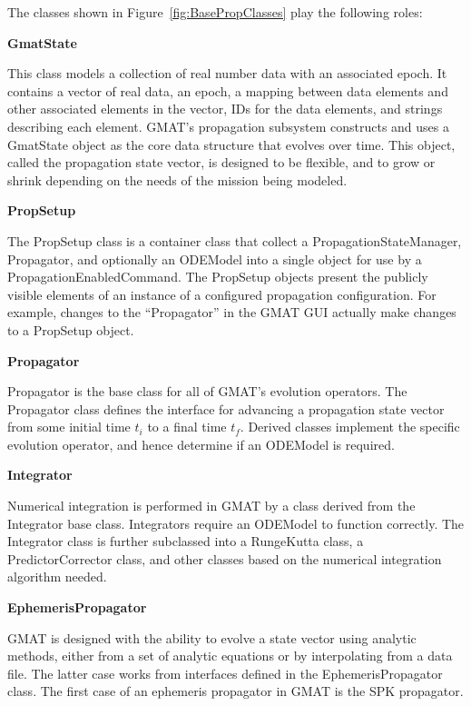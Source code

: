 \documentclass[letterpaper,10pt]{article}
\begin{document}
The classes shown in Figure~\ref{fig:BasePropClasses} play the following roles:

\begin{description}
\item \textbf{GmatState}

This class models a collection of real number data with an associated epoch. 
It contains a vector of real data, an epoch, a mapping between data elements
and other associated elements in the vector, IDs for the data elements, and
strings describing each element. GMAT's propagation subsystem constructs and
uses a GmatState object as the core data structure that evolves over time. 
This object, called the propagation state vector, is designed to be flexible,
and to grow or shrink depending on the needs of the mission being modeled. 

\item \textbf{PropSetup}

The PropSetup class is a container class that collect a
PropagationStateManager, Propagator, and optionally an ODEModel into a single
object for use by a PropagationEnabledCommand.  The PropSetup objects present
the publicly visible elements of an instance of a configured propagation
configuration. For example, changes to the ``Propagator'' in the GMAT GUI
actually make changes to a PropSetup object.

\item \textbf{Propagator}

Propagator is the base class for all of GMAT's evolution operators.  The
Propagator class defines the interface for advancing a propagation state vector
from some initial time $t_i$ to a final time $t_f$.  Derived classes implement
the specific evolution operator, and hence determine if an ODEModel is required.

\item \textbf{Integrator}

Numerical integration is performed in GMAT by a class derived from the
Integrator base class.  Integrators require an ODEModel to function correctly. 
The Integrator class is further subclassed into a RungeKutta class, a
PredictorCorrector class, and other classes based on the numerical integration
algorithm needed.

\item\textbf{EphemerisPropagator}

GMAT is designed with the ability to evolve a state vector using analytic
methods, either from a set of analytic equations or by interpolating from a data
file.  The latter case works from interfaces defined in the EphemerisPropagator
class. The first case of an ephemeris propagator in GMAT is the SPK
propagator.


\end{description}
\end{document}
